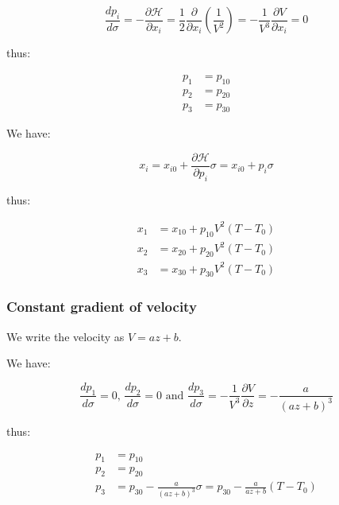 \documentclass[methods.tex]{subfiles}
\begin{document}
\begin{equation}
\frac{dp_i}{d\sigma} = - \frac{\partial \mathcal H}{\partial x_i} = \frac{1}{2} \frac{\partial}{\partial x_i} (\frac{1}{V^2}) = - \frac{1}{V^3} \frac{\partial V}{\partial x_i} = 0
\end{equation}

thus:

\begin{equation}
\begin{split}
p_1 & = p_{10} \\
p_2 & = p_{20} \\
p_3 & = p_{30}
\end{split}
\end{equation}

We have:

\begin{equation}
x_i = x_{i0} + \frac{\partial \mathcal H}{\partial p_i} \sigma = x_{i0} + p_i \sigma
\end{equation}

thus:

\begin{equation}
\begin{split}
x_1 & = x_{10} + p_{10} V^2 (T - T_0) \\
x_2 & = x_{20} + p_{20} V^2 (T - T_0) \\
x_3 & = x_{30} + p_{30} V^2 (T - T_0)
\end{split}
\end{equation}

\subsubsection{Constant gradient of velocity}

We write the velocity as $V = a z + b$.

We have:

\begin{equation}
\frac{dp_1}{d\sigma} = 0 \text{, } \frac{dp_2}{d\sigma} = 0 \text{ and } \frac{dp_3}{d\sigma} = - \frac{1}{V^3} \frac{\partial V}{\partial z} = - \frac{a}{(a z + b)^3}
\end{equation}

thus:

\begin{equation}
\begin{split}
p_1 & = p_{10} \\
p_2 & = p_{20} \\
p_3 & = p_{30} - \frac{a}{(a z + b)^3} \sigma = p_{30} - \frac{a}{a z + b} (T - T_0)
\end{split}
\end{equation}
\end{document}

